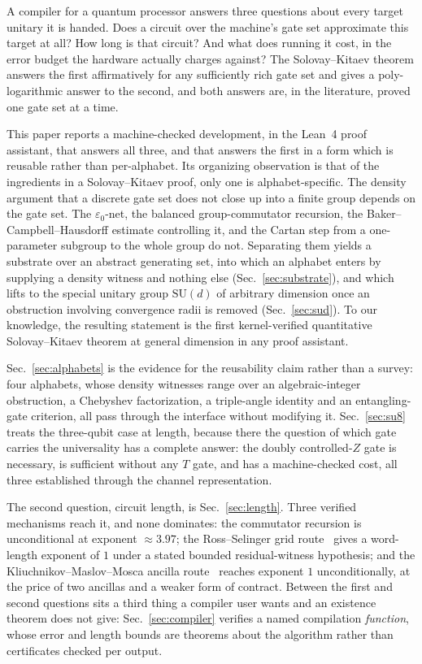 \documentclass[aps,pra,reprint,nofootinbib,superscriptaddress]{revtex4-2}
\newcommand{\su}[1]{\mathrm{SU}(#1)}
\theoremstyle{plain}
\theoremstyle{definition}
\begin{document}
A compiler for a quantum processor answers three questions about every target
unitary it is handed. Does a circuit over the machine's gate set approximate
this target at all? How long is that circuit? And what does running it cost, in
the error budget the hardware actually charges against? The Solovay--Kitaev
theorem answers the first affirmatively for any sufficiently rich gate set and
gives a poly-logarithmic answer to the second, and both answers are, in the
literature, proved one gate set at a time.

This paper reports a machine-checked development, in the Lean~4 proof
assistant, that answers all three, and that answers the first in a form which
is reusable rather than per-alphabet. Its organizing observation is that of the
ingredients in a Solovay--Kitaev proof, only one is alphabet-specific. The
density argument that a discrete gate set does not close up into a finite group
depends on the gate set. The $\varepsilon_0$-net, the balanced group-commutator
recursion, the Baker--Campbell--Hausdorff estimate controlling it, and the
Cartan step from a one-parameter subgroup to the whole group do not. Separating
them yields a substrate over an abstract generating set, into which an alphabet
enters by supplying a density witness and nothing else
(Sec.~\ref{sec:substrate}), and which lifts to the special unitary group
$\su d$ of arbitrary dimension once an obstruction involving convergence radii
is removed (Sec.~\ref{sec:sud}). To our knowledge, the resulting statement is
the first kernel-verified quantitative Solovay--Kitaev theorem at general
dimension in any proof assistant.

Sec.~\ref{sec:alphabets} is the evidence for the reusability claim rather than
a survey: four alphabets, whose density witnesses range over an
algebraic-integer obstruction, a Chebyshev factorization, a triple-angle
identity and an entangling-gate criterion, all pass through the interface
without modifying it. Sec.~\ref{sec:su8} treats the three-qubit case at length,
because there the question of which gate carries the universality has a
complete answer: the doubly controlled-$Z$ gate is necessary, is sufficient
without any $T$ gate, and has a machine-checked cost, all three established
through the channel representation.

The second question, circuit length, is Sec.~\ref{sec:length}. Three verified
mechanisms reach it, and none dominates: the commutator recursion is
unconditional at exponent $\approx 3.97$; the Ross--Selinger grid
route~\cite{RossSelinger2016} gives a word-length exponent of $1$ under a
stated bounded residual-witness hypothesis; and the
Kliuchnikov--Maslov--Mosca ancilla route~\cite{KMM2013ancilla} reaches exponent
$1$ unconditionally, at the price of two ancillas and a weaker form of
contract. Between the first and second questions sits a third thing a compiler
user wants and an existence theorem does not give: Sec.~\ref{sec:compiler}
verifies a named compilation \emph{function}, whose error and length bounds are
theorems about the algorithm rather than certificates checked per output.
\end{document}
